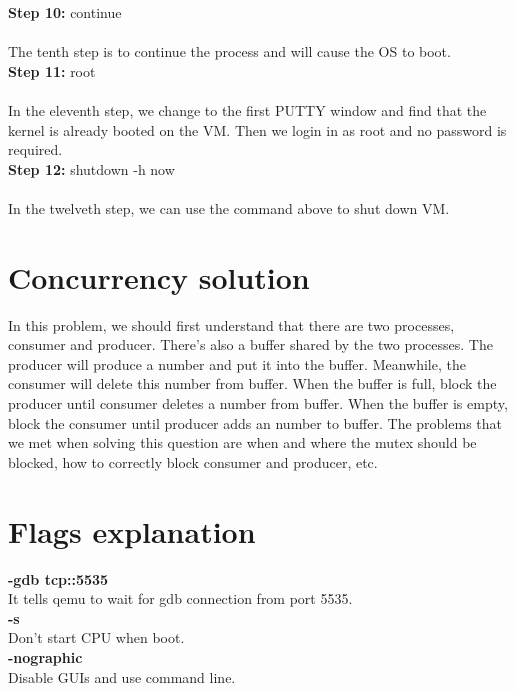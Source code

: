\documentclass[10pt,letterpaper]{article}
\begin{document}
\textbf{Step 10:}
continue\\ \\
The tenth step is to continue the process and will cause the OS to boot. \\

\textbf{Step 11:}
root\\ \\
In the eleventh step, we change to the first PUTTY window and find that the kernel is already booted on the VM. Then we login in as root and no password is required.\\

\textbf{Step 12:}
shutdown -h now\\ \\
In the twelveth step, we can use the command above to shut down VM.\\
 

\section*{Concurrency solution}

\textbf{}
In this problem, we should first understand that there are two processes, consumer and producer. There's also a buffer shared by the two processes. The producer will produce a number and put it into the buffer. Meanwhile, the consumer will delete this number from buffer. When the buffer is full, block the producer until consumer deletes a number from buffer. When the buffer is empty, block the consumer until producer adds an number to buffer. The problems that we met when solving this question are when and where the mutex should be blocked, how to correctly block consumer and producer, etc. 
 
 
\section{Flags explanation}

\textbf{}

\textbf{-gdb tcp::5535}\\
It tells qemu to wait for gdb connection from port 5535.\\

\textbf{-s}\\ 
Don't start CPU when boot.\\
 
\textbf{-nographic}\\ 
Disable GUIs and use command line. \\
 
\end{document}
